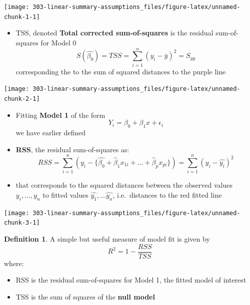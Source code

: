 \documentclass[
]{book}
\providecommand{\tightlist}{%
  \setlength{\itemsep}{0pt}\setlength{\parskip}{0pt}}
\theoremstyle{definition}
\newtheorem{definition}{Definition}[chapter]
\theoremstyle{definition}
\theoremstyle{definition}
\theoremstyle{remark}
\begin{document}
\begin{center}\texttt{[image: 303-linear-summary-assumptions\_files/figure-latex/unnamed-chunk-1-1]} \end{center}

\begin{itemize}
\tightlist
\item
  TSS, denoted \textbf{Total corrected sum-of-squares} is the residual sum-of-squares for Model 0
  \[S(\hat{\beta_0}) = TSS = \sum_{i=1}^{n}(y_i - \bar{y})^2 = S_{yy}\] corresponding the to the sum of squared distances to the purple line
\end{itemize}

\begin{center}\texttt{[image: 303-linear-summary-assumptions\_files/figure-latex/unnamed-chunk-2-1]} \end{center}

\begin{itemize}
\tightlist
\item
  Fitting \textbf{Model 1} of the form \[Y_i = \beta_0 + \beta_1x + \epsilon_i\] we have earlier defined
\item
  \textbf{RSS}, the residual sum-of-squares as:
  \[RSS = \displaystyle \sum_{i=1}^{n}(y_i - \{\hat{\beta_0} + \hat{\beta}_1x_{1i} + \dots + \hat{\beta}_px_{pi}\}) = \sum_{i=1}^{n}(y_i - \hat{y_i})^2\]
\item
  that corresponds to the squared distances between the observed values \(y_i, \dots,y_n\) to fitted values \(\hat{y_1}, \dots \hat{y_n}\), i.e.~distances to the red fitted line
\end{itemize}

\begin{center}\texttt{[image: 303-linear-summary-assumptions\_files/figure-latex/unnamed-chunk-3-1]} \end{center}

\begin{definition}
\protect\hypertarget{def:unnamed-chunk-4}{}{\label{def:unnamed-chunk-4} }
A simple but useful measure of model fit is given by \[R^2 = 1 - \frac{RSS}{TSS}\] where:

\begin{itemize}
\tightlist
\item
  RSS is the residual sum-of-squares for Model 1, the fitted model of interest
\item
  TSS is the sum of squares of the \textbf{null model}
\end{itemize}
\end{definition}
\end{document}
